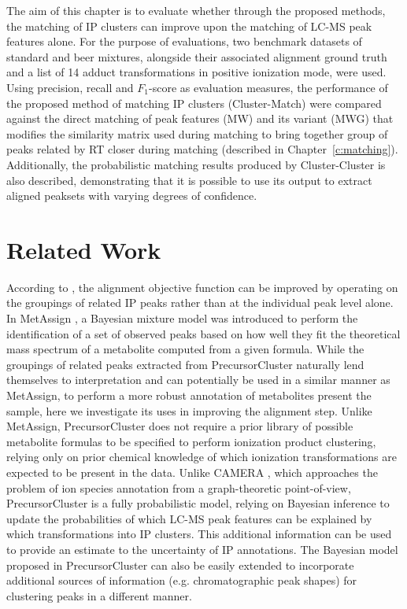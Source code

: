 The aim of this chapter is to evaluate whether through the proposed methods, the matching of IP clusters can improve upon the matching of LC-MS peak features alone. For the purpose of evaluations, two benchmark datasets of standard and beer mixtures, alongside their associated alignment ground truth and a list of 14 adduct transformations in positive ionization mode, were used. Using precision, recall and $F_1$-score as evaluation measures, the performance of the proposed method of matching IP clusters (Cluster-Match) were compared against the direct matching of peak features (MW) and its variant (MWG) that modifies the similarity matrix used during matching to bring together group of peaks related by RT closer during matching (described in Chapter~\ref{c:matching}). Additionally, the probabilistic matching results produced by Cluster-Cluster is also described, demonstrating that it is possible to use its output to extract aligned peaksets with varying degrees of confidence.

\section{Related Work}

According to \cite{Smith2015}, the alignment objective function can be improved by operating on the groupings of related IP peaks rather than at the individual peak level alone. In MetAssign \cite{Daly2014}, a Bayesian mixture model was introduced to perform the identification of a set of observed peaks based on how well they fit the theoretical mass spectrum of a metabolite computed from a given formula. While the groupings of related peaks extracted from PrecursorCluster naturally lend themselves to interpretation and can potentially be used in a similar manner as MetAssign, to perform a more robust annotation of metabolites present the sample, here we investigate its uses in improving the alignment step. Unlike MetAssign, PrecursorCluster does not require a prior library of possible metabolite formulas to be specified to perform ionization product clustering, relying only on prior chemical knowledge of which ionization transformations are expected to be present in the data. Unlike CAMERA \cite{Kuhl2012}, which approaches the problem of ion species annotation from a graph-theoretic point-of-view, PrecursorCluster is a fully probabilistic model, relying on Bayesian inference to update the probabilities of which LC-MS peak features can be explained by which transformations into IP clusters. This additional information can be used to provide an estimate to the uncertainty of IP annotations. The Bayesian model proposed in PrecursorCluster can also be easily extended to incorporate additional sources of information (e.g. chromatographic peak shapes) for clustering peaks in a different manner. 

